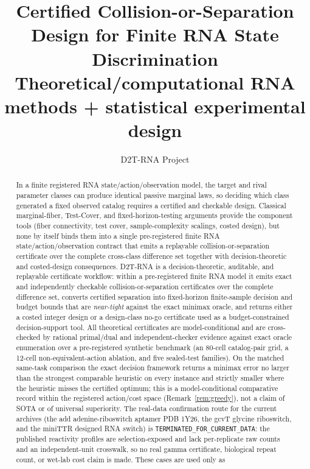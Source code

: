 \documentclass[11pt]{article}
\title{Certified Collision-or-Separation Design for Finite RNA State Discrimination\\[0.5em]\large Theoretical/computational RNA methods + statistical experimental design}
\author{D2T-RNA Project}
\date{}
\begin{document}
\maketitle

\begin{abstract}
In a finite registered RNA state/action/observation model, the target and rival parameter classes can
produce identical passive marginal laws, so deciding which class generated a fixed observed catalog
requires a certified and checkable design. Classical marginal-fiber, Test-Cover, and fixed-horizon-testing
arguments provide the component tools (fiber connectivity, test cover, sample-complexity scalings,
costed design), but none by itself binds them into a single pre-registered finite RNA
state/action/observation contract that emits a replayable collision-or-separation certificate over the
complete cross-class difference set together with decision-theoretic and costed-design consequences.
D2T-RNA is a decision-theoretic, auditable, and replayable certificate workflow: within a pre-registered
finite RNA model it emits exact and independently checkable collision-or-separation certificates over the
complete difference set, converts certified separation into fixed-horizon finite-sample decision and
budget bounds that are \emph{near-tight} against the exact minimax oracle, and returns either a costed
integer design or a design-class no-go certificate used as a budget-constrained decision-support tool.
All theoretical certificates are model-conditional and are cross-checked by rational primal/dual and
independent-checker evidence against exact oracle enumeration over a pre-registered synthetic
benchmark (an 80-cell catalog-pair grid, a 12-cell non-equivalent-action ablation, and five
sealed-test families). On the matched same-task comparison the exact decision framework returns a
minimax error no larger than the strongest comparable heuristic on every instance and strictly
smaller where the heuristic misses the certified optimum; this is a model-conditional comparative
record within the registered action/cost space (Remark~\ref{rem:greedy}), not a claim of SOTA or
of universal superiority. The real-data confirmation route for the current archives (the add
adenine-riboswitch aptamer PDB 1Y26, the gcvT glycine riboswitch, and the miniTTR designed RNA switch)
is \texttt{TERMINATED\_FOR\_CURRENT\_DATA}: the published reactivity profiles are selection-exposed
and lack per-replicate raw counts and an independent-unit crosswalk, so no real gamma certificate,
biological repeat count, or wet-lab cost claim is made. These cases are used only as

\end{abstract}
\end{document}
